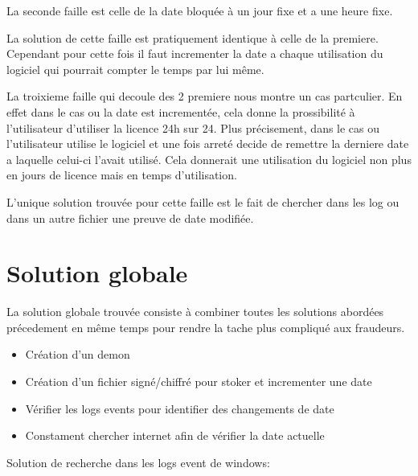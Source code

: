 	La seconde faille est celle de la date bloquée à un jour fixe et a une heure fixe. \newline

  La solution de cette faille est pratiquement identique à celle de la premiere. Cependant pour cette fois il faut incrementer la date
  a chaque utilisation du logiciel qui pourrait compter le temps par lui même. \newline

  La troixieme faille qui decoule des 2 premiere nous montre un cas partculier. En effet dans le cas ou la date est incrementée, cela donne la prossibilité à l'utilisateur
	d'utiliser la licence 24h sur 24. Plus précisement, dans le cas ou l'utilisateur utilise le logiciel et une fois arreté decide de remettre la derniere date a laquelle 
	celui-ci l'avait utilisé. Cela donnerait une utilisation du logiciel  non plus en jours de licence mais en temps d'utilisation.\newline

	L'unique solution trouvée pour cette faille est le fait de chercher dans les log ou dans un autre fichier une preuve de date modifiée.\newline

\section{Solution globale}

La solution globale trouvée consiste à combiner toutes les solutions abordées précedement en même temps pour rendre la tache plus compliqué aux fraudeurs.\newline

\begin{itemize}
	\item Création d'un demon
	\item Création d'un fichier signé/chiffré pour stoker et incrementer une date  
	\item Vérifier les logs events pour identifier des changements de date
	\item Constament chercher internet afin de vérifier la date actuelle\newline
\end{itemize}

Solution de recherche dans les logs event de windows:\newline


